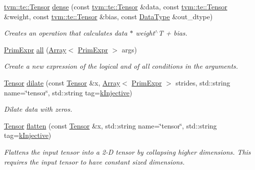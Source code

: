 \begin{DoxyCompactItemize}
\hyperlink{classtvm_1_1te_1_1Tensor}{tvm\+::te\+::\+Tensor} \hyperlink{namespacetopi_1_1nn_abe55c065905a614f105da095a7f036ea}{dense} (const \hyperlink{classtvm_1_1te_1_1Tensor}{tvm\+::te\+::\+Tensor} \&data, const \hyperlink{classtvm_1_1te_1_1Tensor}{tvm\+::te\+::\+Tensor} \&weight, const \hyperlink{classtvm_1_1te_1_1Tensor}{tvm\+::te\+::\+Tensor} \&bias, const \hyperlink{namespacetvm_a41918af1a1dc386388639a9d3ad06c5d}{Data\+Type} \&out\+\_\+dtype)
\begin{DoxyCompactList}\small\item\em Creates an operation that calculates data $\ast$ weight$^\wedge$T + bias. \end{DoxyCompactList}\item 
\hyperlink{classtvm_1_1PrimExpr}{Prim\+Expr} \hyperlink{namespacetopi_1_1nn_ad57ccdad6f841aaafa2f64062f249a47}{all} (\hyperlink{classtvm_1_1Array}{Array}$<$ \hyperlink{classtvm_1_1PrimExpr}{Prim\+Expr} $>$ args)
\begin{DoxyCompactList}\small\item\em Create a new expression of the logical and of all conditions in the arguments. \end{DoxyCompactList}\item 
\hyperlink{classtvm_1_1te_1_1Tensor}{Tensor} \hyperlink{namespacetopi_1_1nn_a6ac795264be73287d92fcd7be8943ddc}{dilate} (const \hyperlink{classtvm_1_1te_1_1Tensor}{Tensor} \&x, \hyperlink{classtvm_1_1Array}{Array}$<$ \hyperlink{classtvm_1_1PrimExpr}{Prim\+Expr} $>$ strides, std\+::string name=\char`\"{}tensor\char`\"{}, std\+::string tag=\hyperlink{namespacetopi_a60f05ec416e4618d25ad00dd9f536934}{k\+Injective})
\begin{DoxyCompactList}\small\item\em Dilate data with zeros. \end{DoxyCompactList}\item 
\hyperlink{classtvm_1_1te_1_1Tensor}{Tensor} \hyperlink{namespacetopi_1_1nn_a84054f5c8010db45e80365c3c2c6e1d4}{flatten} (const \hyperlink{classtvm_1_1te_1_1Tensor}{Tensor} \&x, std\+::string name=\char`\"{}tensor\char`\"{}, std\+::string tag=\hyperlink{namespacetopi_a60f05ec416e4618d25ad00dd9f536934}{k\+Injective})
\begin{DoxyCompactList}\small\item\em Flattens the input tensor into a 2-\/D tensor by collapsing higher dimensions. This requires the input tensor to have constant sized dimensions. \end{DoxyCompactList}\item 

\end{DoxyCompactItemize}
